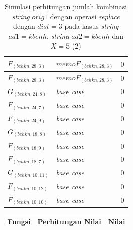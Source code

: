 \begin{appendices}
\begin{table}[H]
\begin{tabular} {|p{3cm}|p{5cm}|p{1cm}|}
  		$ F_{(behkn, 28, 3)}  $ & $memoF_{(behkn, 28, 3)}$ & $ 0 $ \\ \hline
  		$ F_{(behkn, 28, 3)}  $ & $memoF_{(behkn, 28, 3)}$ & $ 0 $ \\ \hline
  		$ G_{(behkn, 24, 8)} $ & \textit{base case} & $ 0 $ \\ \hline
  		$ F_{(behkn, 24, 7)} $ & \textit{base case} & $ 0 $ \\ \hline
  		$ F_{(behkn, 24, 9)} $ & \textit{base case} & $ 0 $ \\ \hline
  		$ G_{(behkn, 18, 8)} $ & \textit{base case} & $ 0 $ \\ \hline
  		$ F_{(behkn, 18, 9)} $ & \textit{base case} & $ 0 $ \\ \hline
  		$ F_{(behkn, 18, 7)} $ & \textit{base case} & $ 0 $ \\ \hline
  		$ G_{(behkn, 10, 11)} $ & \textit{base case} & $ 0 $ \\ \hline
  		$ F_{(behkn, 10, 12)} $ & \textit{base case} & $ 0 $ \\ \hline
  		$ F_{(behkn, 10, 10)} $ & \textit{base case} & $ 0 $ \\ \hline
  	\end{tabular}\caption{Simulasi perhitungan jumlah kombinasi \textit{string} $ orig1 $ dengan operasi \textit{replace} dengan $ dist= 3  $ pada kasus \textit{string} $ ad1=kbenh $, \textit{string} $ ad2=kbenh $ dan $ X=5 $ (2)}
  	\label{tab:g_3_orig1_3_2}
  \end{table}
  \begin{table}[H]
  	\centering
  	\begin{tabular} {|p{3cm}|p{5cm}|p{1cm}|} \hline
  		Fungsi & Perhitungan Nilai & Nilai \\ \hline
  		

\end{tabular}
\end{table}
\end{appendices}
